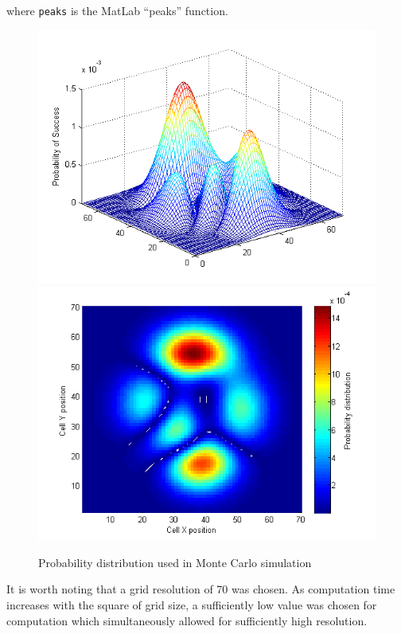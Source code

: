 \documentclass[a4paper]{article}
\begin{document}
where \texttt{peaks} is the MatLab ``peaks'' function.

\begin{figure}[H]\begin{center}
\includegraphics[scale=0.5]{../Matlab/Images/InitialProbDist.png}
\includegraphics[scale=0.5]{../Matlab/Images/InitialProbDistSurf.png}
\caption{Probability distribution used in Monte Carlo simulation}
\end{center}\end{figure}

It is worth noting that a grid resolution of 70 was chosen. As computation time increases with the square of grid size, a sufficiently low value was chosen for computation which simultaneously allowed for sufficiently high resolution. 
\end{document}
